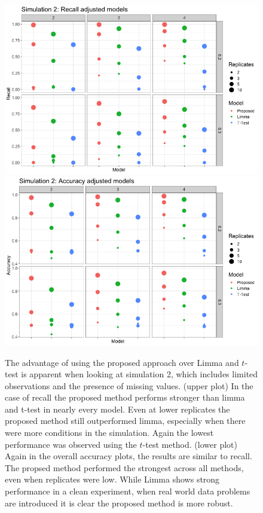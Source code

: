 \documentclass{mcp}
\begin{document}
\begin{figure}[h!]
\centering
\includegraphics[width=.85\textwidth]{sim_new/sim3_Recall}
\includegraphics[width=.85\textwidth]{sim_new/sim3_Accuracy}
\caption{The advantage of using the proposed approach over Limma and $t$-test is apparent when looking at simulation 2, which includes limited observations and the presence of missing values. (upper plot) In the case of recall the proposed method performs stronger than limma and t-test in nearly every model. Even at lower replicates the proposed method still outperformed limma, especially when there were more conditions in the simulation. Again the lowest performance was observed using the $t$-test method. (lower plot) Again in the overall accuracy plots, the results are similar to recall. The propsed method performed the strongest across all methods, even when replicates were low. While Limma shows strong performance in a clean experiment, when real world data problems are introduced it is clear the proposed method is more robust. \label{fig:sim2_recall}}
\end{figure}
\end{document}
